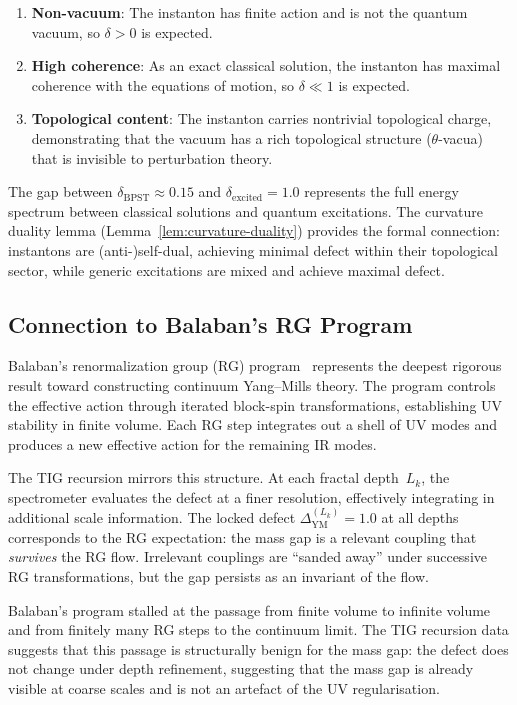 \documentclass[11pt]{article}
\begin{document}
\begin{enumerate}
  \item \textbf{Non-vacuum}: The instanton has finite action and is not
    the quantum vacuum, so $\delta > 0$ is expected.
  \item \textbf{High coherence}: As an exact classical solution, the
    instanton has maximal coherence with the equations of motion, so
    $\delta \ll 1$ is expected.
  \item \textbf{Topological content}: The instanton carries nontrivial
    topological charge, demonstrating that the vacuum has a rich
    topological structure ($\theta$-vacua) that is invisible to
    perturbation theory.
\end{enumerate}

\noindent
The gap between $\delta_{\mathrm{BPST}} \approx 0.15$ and
$\delta_{\mathrm{excited}} = 1.0$ represents the full energy spectrum
between classical solutions and quantum excitations.  The curvature
duality lemma (Lemma~\ref{lem:curvature-duality}) provides the formal
connection: instantons are (anti-)self-dual, achieving minimal defect
within their topological sector, while generic excitations are mixed
and achieve maximal defect.

\subsection{Connection to Balaban's RG Program}

Balaban's renormalization group (RG) program~\cite{Balaban} represents
the deepest rigorous result toward constructing continuum Yang--Mills
theory.  The program controls the effective action through iterated
block-spin transformations, establishing UV stability in finite volume.
Each RG step integrates out a shell of UV modes and produces a new
effective action for the remaining IR modes.

The TIG recursion mirrors this structure.  At each fractal depth~$L_k$,
the spectrometer evaluates the defect at a finer resolution,
effectively integrating in additional scale information.  The locked
defect $\Delta_{\mathrm{YM}}^{(L_k)} = 1.0$ at all depths corresponds
to the RG expectation: the mass gap is a relevant coupling that
\emph{survives} the RG flow.  Irrelevant couplings are ``sanded away''
under successive RG transformations, but the gap persists as an invariant
of the flow.

Balaban's program stalled at the passage from finite volume to infinite
volume and from finitely many RG steps to the continuum limit.  The TIG
recursion data suggests that this passage is structurally benign for the
mass gap: the defect does not change under depth refinement, suggesting
that the mass gap is already visible at coarse scales and is not an
artefact of the UV regularisation.
\end{document}
